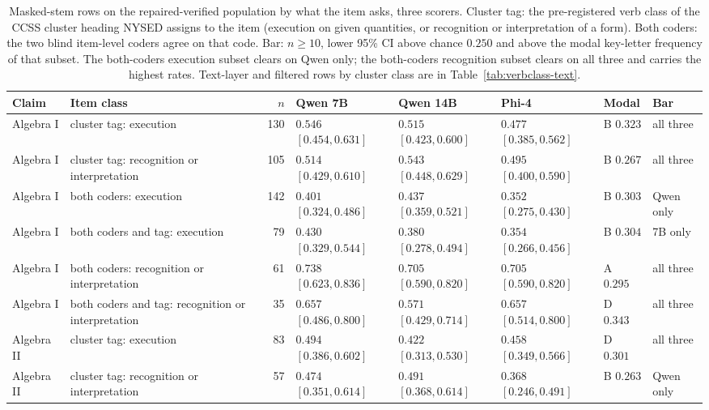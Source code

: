 \begin{table}[t]
  \caption{Masked-stem rows on the repaired-verified population by what the item asks, three scorers. Cluster tag: the pre-registered verb class of the CCSS cluster heading NYSED assigns to the item (execution on given quantities, or recognition or interpretation of a form). Both coders: the two blind item-level coders agree on that code. Bar: $n\ge 10$, lower 95\% CI above chance $0.250$ and above the modal key-letter frequency of that subset. The both-coders execution subset clears on Qwen only; the both-coders recognition subset clears on all three and carries the highest rates. Text-layer and filtered rows by cluster class are in Table~\ref{tab:verbclass-text}.}
  \label{tab:verbclass}
  \centering
  \scriptsize
  \begin{tabular}{l l r l l l l l}
    \toprule
    Claim & Item class & $n$ & Qwen 7B & Qwen 14B & Phi-4 & Modal & Bar \\
    \midrule
    Algebra I & cluster tag: execution & 130 & $0.546$ $[0.454, 0.631]$ & $0.515$ $[0.423, 0.600]$ & $0.477$ $[0.385, 0.562]$ & B $0.323$ & all three \\
    Algebra I & cluster tag: recognition or interpretation & 105 & $0.514$ $[0.429, 0.610]$ & $0.543$ $[0.448, 0.629]$ & $0.495$ $[0.400, 0.590]$ & B $0.267$ & all three \\
    Algebra I & both coders: execution & 142 & $0.401$ $[0.324, 0.486]$ & $0.437$ $[0.359, 0.521]$ & $0.352$ $[0.275, 0.430]$ & B $0.303$ & Qwen only \\
    Algebra I & both coders and tag: execution & 79 & $0.430$ $[0.329, 0.544]$ & $0.380$ $[0.278, 0.494]$ & $0.354$ $[0.266, 0.456]$ & B $0.304$ & 7B only \\
    Algebra I & both coders: recognition or interpretation & 61 & $0.738$ $[0.623, 0.836]$ & $0.705$ $[0.590, 0.820]$ & $0.705$ $[0.590, 0.820]$ & A $0.295$ & all three \\
    Algebra I & both coders and tag: recognition or interpretation & 35 & $0.657$ $[0.486, 0.800]$ & $0.571$ $[0.429, 0.714]$ & $0.657$ $[0.514, 0.800]$ & D $0.343$ & all three \\
    Algebra II & cluster tag: execution & 83 & $0.494$ $[0.386, 0.602]$ & $0.422$ $[0.313, 0.530]$ & $0.458$ $[0.349, 0.566]$ & D $0.301$ & all three \\
    Algebra II & cluster tag: recognition or interpretation & 57 & $0.474$ $[0.351, 0.614]$ & $0.491$ $[0.368, 0.614]$ & $0.368$ $[0.246, 0.491]$ & B $0.263$ & Qwen only \\
    \bottomrule
  \end{tabular}
\end{table}


